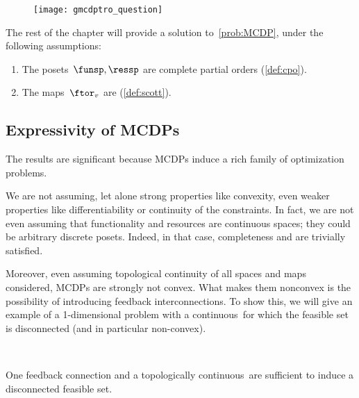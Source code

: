 \begin{figure}
	\texttt{[image: gmcdptro\_question]}
	\caption{}
	\label{fig:question}
\end{figure}

The rest of the chapter will provide a solution to~\cref{prob:MCDP},
under the following assumptions:

\begin{enumerate}
	\item The posets~$\funsp,\ressp$ are complete partial orders (\cref{def:cpo}).
	\item The maps~$\ftor_v$ are \scottcontinuous (\cref{def:scott}).
\end{enumerate}

\subsection{Expressivity of MCDPs}
The results are significant because MCDPs induce a rich family of optimization problems.

We are not assuming, let alone strong properties like convexity, even weaker properties like differentiability or continuity of the constraints.
In fact, we are not even assuming that functionality and resources are continuous spaces; they could be arbitrary discrete posets.
Indeed, in that case, completeness and \scottcontinuity are trivially satisfied.


Moreover, even assuming topological continuity of all spaces and maps considered, MCDPs are strongly not convex.
What makes them nonconvex is the possibility of introducing feedback interconnections.
To show this, we will give an example of a 1-dimensional problem with a continuous~\ftor for which the feasible set is disconnected (and in particular non-convex).

\begin{marginfigure}
	\centering
	 \\
	\caption{One feedback connection and a topologically continuous~\ftor are sufficient to induce a disconnected feasible set.}
	\label{fig:ceil-1}
\end{marginfigure}

